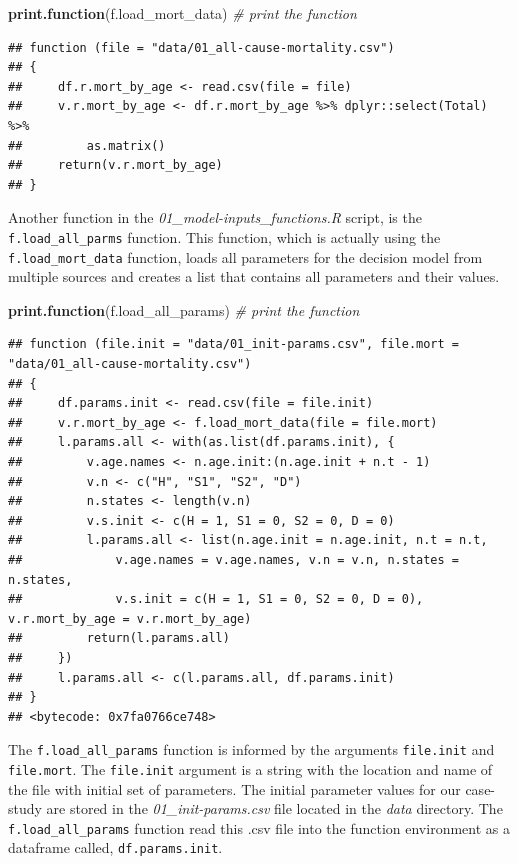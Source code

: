 \documentclass[]{article}
\newenvironment{Shaded}{\begin{snugshade}}{\end{snugshade}}
\newcommand{\KeywordTok}[1]{\textcolor[rgb]{0.13,0.29,0.53}{\textbf{#1}}}
\newcommand{\CommentTok}[1]{\textcolor[rgb]{0.56,0.35,0.01}{\textit{#1}}}
\newcommand{\NormalTok}[1]{#1}
\begin{document}
\begin{Shaded}
\begin{Highlighting}[]
\KeywordTok{print.function}\NormalTok{(f.load_mort_data) }\CommentTok{# print the function}
\end{Highlighting}
\end{Shaded}

\begin{verbatim}
## function (file = "data/01_all-cause-mortality.csv") 
## {
##     df.r.mort_by_age <- read.csv(file = file)
##     v.r.mort_by_age <- df.r.mort_by_age %>% dplyr::select(Total) %>% 
##         as.matrix()
##     return(v.r.mort_by_age)
## }
\end{verbatim}

Another function in the \emph{01\_model-inputs\_functions.R} script, is
the \texttt{f.load\_all\_parms} function. This function, which is
actually using the \texttt{f.load\_mort\_data} function, loads all
parameters for the decision model from multiple sources and creates a
list that contains all parameters and their values.

\begin{Shaded}
\begin{Highlighting}[]
\KeywordTok{print.function}\NormalTok{(f.load_all_params)  }\CommentTok{# print the function}
\end{Highlighting}
\end{Shaded}

\begin{verbatim}
## function (file.init = "data/01_init-params.csv", file.mort = "data/01_all-cause-mortality.csv") 
## {
##     df.params.init <- read.csv(file = file.init)
##     v.r.mort_by_age <- f.load_mort_data(file = file.mort)
##     l.params.all <- with(as.list(df.params.init), {
##         v.age.names <- n.age.init:(n.age.init + n.t - 1)
##         v.n <- c("H", "S1", "S2", "D")
##         n.states <- length(v.n)
##         v.s.init <- c(H = 1, S1 = 0, S2 = 0, D = 0)
##         l.params.all <- list(n.age.init = n.age.init, n.t = n.t, 
##             v.age.names = v.age.names, v.n = v.n, n.states = n.states, 
##             v.s.init = c(H = 1, S1 = 0, S2 = 0, D = 0), v.r.mort_by_age = v.r.mort_by_age)
##         return(l.params.all)
##     })
##     l.params.all <- c(l.params.all, df.params.init)
## }
## <bytecode: 0x7fa0766ce748>
\end{verbatim}

The \texttt{f.load\_all\_params} function is informed by the arguments
\texttt{file.init} and \texttt{file.mort}. The \texttt{file.init}
argument is a string with the location and name of the file with initial
set of parameters. The initial parameter values for our case-study are
stored in the \emph{01\_init-params.csv} file located in the \emph{data}
directory. The \texttt{f.load\_all\_params} function read this .csv file
into the function environment as a dataframe called,
\texttt{df.params.init}.
\end{document}

